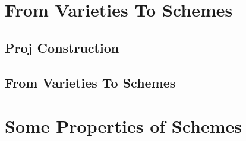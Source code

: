 \documentclass[11pt]{article}
\begin{document}
\begin{example}
    \cite[Exercise II.2.8]{hartsAG}
\end{example}

\begin{example}
    \cite[Example II.2.3.5]{hartsAG}
\end{example}

\begin{example}
    \cite[Example II.2.3.6]{hartsAG}
\end{example}


\section{From Varieties To Schemes}

\subsection{Proj Construction} 

\begin{definition}[Proj]
    
\end{definition}

\begin{lemma}
    \cite[Lemma II.2.4]{hartsAG}
\end{lemma}


\begin{corollary}
    \cite[Proposition II.2.5]{hartsAG}
\end{corollary}

\begin{example}
    \cite[Example II.2.5.1]{hartsAG}
\end{example}



\subsection{From Varieties To Schemes}





\begin{proposition}
    \cite[Proposition II.2.6]{hartsAG}
\end{proposition}


\section{Some Properties of Schemes}
\end{document}
